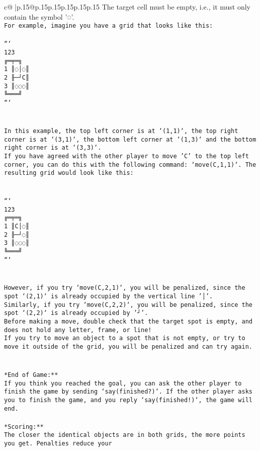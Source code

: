 \documentclass{article}
\begin{document}
{\begin{supertabular}{c@{$\;$}|p{.15\linewidth}@{}p{.15\linewidth}p{.15\linewidth}p{.15\linewidth}p{.15\linewidth}p{.15\linewidth}}
{{{The target cell must be empty, i.e., it must only contain the symbol '◌'.\\ \tt * For example, imagine you have a grid that looks like this: \\ \tt \\ \tt ```\\ \tt     123\\ \tt    ╔═╤═╗\\ \tt  1 ║◌│◌║\\ \tt  2 ╟─┘C║\\ \tt  3 ║◌◌◌║\\ \tt    ╚═══╝\\ \tt ```\\ \tt \\ \tt \\ \tt * In this example, the top left corner is at `(1,1)`, the top right corner is at `(3,1)`, the bottom left corner at `(1,3)` and the bottom right corner is at `(3,3)`.\\ \tt * If you have agreed with the other player to move 'C' to the top left corner, you can do this with the following command: `move(C,1,1)`. The resulting grid would look like this: \\ \tt \\ \tt \\ \tt ```\\ \tt     123\\ \tt    ╔═╤═╗\\ \tt  1 ║C│◌║\\ \tt  2 ╟─┘◌║\\ \tt  3 ║◌◌◌║\\ \tt    ╚═══╝\\ \tt ```\\ \tt \\ \tt \\ \tt * However, if you try `move(C,2,1)`, you will be penalized, since the spot `(2,1)` is already occupied by the vertical line '│'.\\ \tt * Similarly, if you try `move(C,2,2)`, you will be penalized, since the spot `(2,2)` is already occupied by '┘'.\\ \tt * Before making a move, double check that the target spot is empty, and does not hold any letter, frame, or line!\\ \tt * If you try to move an object to a spot that is not empty, or try to move it outside of the grid, you will be penalized and can try again.\\ \tt \\ \tt \\ \tt **End of Game:**\\ \tt If you think you reached the goal, you can ask the other player to finish the game by sending `say(finished?)`. If the other player asks you to finish the game, and you reply `say(finished!)`, the game will end.\\ \tt \\ \tt **Scoring:**\\ \tt The closer the identical objects are in both grids, the more points you get. Penalties reduce your }}}
\end{supertabular}}
\end{document}

